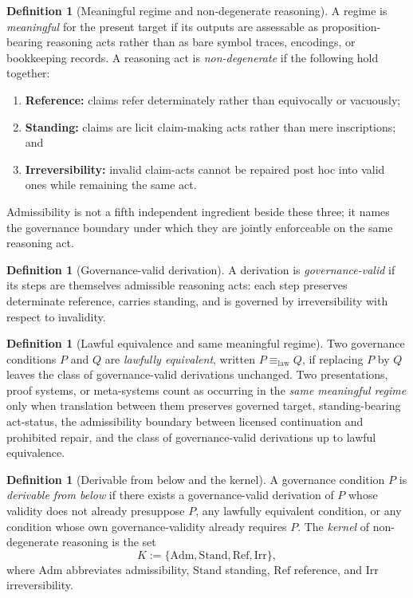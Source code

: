 \documentclass[11pt]{article}
\theoremstyle{plain}
\theoremstyle{definition}
\newtheorem{definition}[theorem]{Definition}
\newcommand{\Adm}{\mathrm{Adm}}
\newcommand{\Stand}{\mathrm{Stand}}
\begin{document}
\begin{definition}[Meaningful regime and non-degenerate reasoning]
A regime is \emph{meaningful} for the present target if its outputs are assessable as proposition-bearing reasoning acts rather than as bare symbol traces, encodings, or bookkeeping records. A reasoning act is \emph{non-degenerate} if the following hold together:
\begin{enumerate}[label=(\roman*), leftmargin=2.5em]
    \item \textbf{Reference:} claims refer determinately rather than equivocally or vacuously;
    \item \textbf{Standing:} claims are licit claim-making acts rather than mere inscriptions; and
    \item \textbf{Irreversibility:} invalid claim-acts cannot be repaired post hoc into valid ones while remaining the same act.
\end{enumerate}
Admissibility is not a fifth independent ingredient beside these three; it names the governance boundary under which they are jointly enforceable on the same reasoning act.
\end{definition}

\begin{definition}[Governance-valid derivation]
A derivation is \emph{governance-valid} if its steps are themselves admissible reasoning acts: each step preserves determinate reference, carries standing, and is governed by irreversibility with respect to invalidity.
\end{definition}

\begin{definition}[Lawful equivalence and same meaningful regime]
Two governance conditions $P$ and $Q$ are \emph{lawfully equivalent}, written $P\equiv_{\mathrm{law}} Q$, if replacing $P$ by $Q$ leaves the class of governance-valid derivations unchanged. Two presentations, proof systems, or meta-systems count as occurring in the \emph{same meaningful regime} only when translation between them preserves governed target, standing-bearing act-status, the admissibility boundary between licensed continuation and prohibited repair, and the class of governance-valid derivations up to lawful equivalence.
\end{definition}

\begin{definition}[Derivable from below and the kernel]
A governance condition $P$ is \emph{derivable from below} if there exists a governance-valid derivation of $P$ whose validity does not already presuppose $P$, any lawfully equivalent condition, or any condition whose own governance-validity already requires $P$. The \emph{kernel} of non-degenerate reasoning is the set
\[
K:=\{\Adm,\Stand,\mathrm{Ref},\mathrm{Irr}\},
\]
where $\Adm$ abbreviates admissibility, $\Stand$ standing, $\mathrm{Ref}$ reference, and $\mathrm{Irr}$ irreversibility.
\end{definition}
\end{document}
